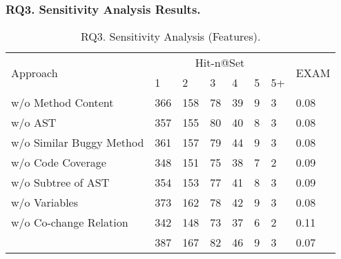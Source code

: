 \subsubsection{\bf RQ3. Sensitivity Analysis Results.}



\begin{table}[t]
	\caption{RQ3. Sensitivity Analysis (Features).}
	{\small
		\begin{center}
			\renewcommand{\arraystretch}{1}
			\begin{tabular}{p{3.3cm}|p{0.3cm}<{\centering}|p{0.3cm}<{\centering}|p{0.3cm}<{\centering}|p{0.3cm}<{\centering}|p{0.3cm}<{\centering}|p{0.3cm}<{\centering}|p{0.7cm}<{\centering}}
				\hline
				\multirow{2}{*}{Approach}    & \multicolumn{6}{c|}{Hit-n@Set}& \multirow{2}{*}{EXAM}\\
				\cline{2-7}
				&1&2&3&4&5&5+&\\
				
				\hline 
				w/o Method Content              & 366 & 158 & 78  & 39 & 9 & 3   & 0.08\\
				w/o	AST	                        & 357 & 155 & 80  & 40 & 8 & 3   & 0.08\\
				w/o Similar Buggy Method    	& 361 & 157 & 79  & 44 & 9 & 3   & 0.08\\
				w/o Code Coverage               & 348 & 151 & 75  & 38 & 7 & 2   & 0.09\\
				w/o	Subtree of AST  	        & 354 & 153 & 77  & 41 & 8 & 3   & 0.09\\
				w/o Variables               	& 373 & 162 & 78  & 42 & 9 & 3   & 0.08\\
				w/o Co-change Relation          & 342 & 148 & 73  & 37 & 6 & 2   & 0.11\\
				\hline
				\tool                           & 387 & 167 & 82  & 46 & 9 & 3   & 0.07\\
				\hline
			\end{tabular}
			
			\label{fig:rq3-1}
		\end{center}
	}
\end{table}

